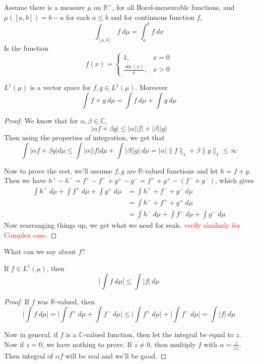 
\chapter{}
\begin{remark}[Warm up]
  Assume there is a measure $\mu$ on $\mathbb{R}^+$, for all Borel-measurable functions, and $\mu([a, b]) = b-a$ for each $a \le b$ and for continuous function $f$, \[
    \int_{[a, b]}  f \ d \mu = \int_{a}^{b} f \ dx
  \]
  Is the function \[
    f(x) = \begin{cases}
      1, & x = 0 \\ 
      \frac{\sin(x)}{x},& x>0
    \end{cases}
  \]
\end{remark}

\begin{theorem}
  $L^1(\mu)$ is a vector space for $f, g \in L^1(\mu)$. Moreover \[
    \int f+g \ d \mu = \int  f \ d \mu + \int  g \ d \mu
  \]
\end{theorem}
\begin{proof}
  We know that for $\alpha, \beta \in \mathbb{C}$, \[
      |\alpha f + \beta g| \le |\alpha||f| + |\beta||g|
  \]
  Then using the properties of integration, we get that \[
      \int |\alpha f + \beta g| d \mu \le \int |\alpha||f| d \mu +  \int |\beta||g| \ d \mu = |\alpha|\|f\|_1 + \beta \|g\|_1 \le \infty
  \]

  Now to prove the rest, we'll assume $f, g$ are $\mathbb{R}$-valued functions and let $h = f+g$. Then we have $h^+ - h^- = f^+ - f^- + g^+ - g^- = f^+ +g^+ - (f^- + g^-)$, which gives \begin{align*}
    \int  h^+ \ d \mu + \int  f^+ \ d \mu + \int  g^+ \ d \mu &= \int  h^+ + f^- + g^- \ d \mu \\ 
    & = \int  h^- + f^+ + g^+ \ d \mu \\ 
    & = \int  h^- \ d \mu + \int  f^- \ d \mu + \int  g^- \ d \mu
  \end{align*}
  Now rearranging things up, we get what we need for reals. \textcolor{red}{verify similarly for Complex case}. 
\end{proof}

\begin{note}
  What can we say about $f$?
\end{note}

\begin{theorem}
  If $f \in L^1(\mu)$, then \[
    \Big| \int  f \ d \mu \Big| \le \int |f| \ d \mu
  \]
\end{theorem}
\begin{proof}
  If $f$ was $\mathbb{R}$-valued, then \[
      \Bigg| \int  f \ d \mu \Bigg| = \Bigg| \int  f^+ \ d \mu + \int f^- \ d \mu \Bigg| \le \Bigg| \int f^+ \ d \mu \Bigg| + \Bigg| \int f^- \ d \mu \Bigg| = \int |f| \ d \mu
  \]

  Now in general, if $f$ is a $\mathbb{C}$-valued function, then let the integral be equal to $z$. Now if $z  =0$, we have nothing to prove. If $z \neq 0$, then multiply $f$  with $\alpha = \frac{\bar{z}}{|z|}$. Then integral of $\alpha f$ will be real and we'll be good.
\end{proof}

